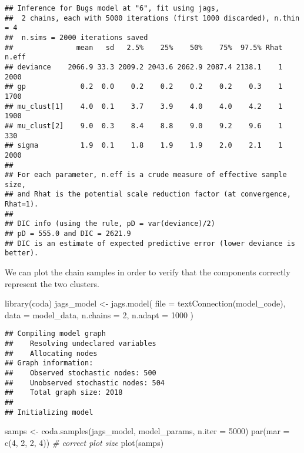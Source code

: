 \documentclass[
  oneside]{book}
\newenvironment{Shaded}{\begin{snugshade}}{\end{snugshade}}
\newcommand{\AttributeTok}[1]{\textcolor[rgb]{0.77,0.63,0.00}{#1}}
\newcommand{\CommentTok}[1]{\textcolor[rgb]{0.56,0.35,0.01}{\textit{#1}}}
\newcommand{\DecValTok}[1]{\textcolor[rgb]{0.00,0.00,0.81}{#1}}
\newcommand{\FunctionTok}[1]{\textcolor[rgb]{0.00,0.00,0.00}{#1}}
\newcommand{\NormalTok}[1]{#1}
\newcommand{\OtherTok}[1]{\textcolor[rgb]{0.56,0.35,0.01}{#1}}
\newcommand{\SpecialCharTok}[1]{\textcolor[rgb]{0.00,0.00,0.00}{#1}}
\begin{document}
\begin{Shaded}
\end{Shaded}

\begin{verbatim}
## Inference for Bugs model at "6", fit using jags,
##  2 chains, each with 5000 iterations (first 1000 discarded), n.thin = 4
##  n.sims = 2000 iterations saved
##               mean   sd   2.5%    25%    50%    75%  97.5% Rhat n.eff
## deviance    2066.9 33.3 2009.2 2043.6 2062.9 2087.4 2138.1    1  2000
## gp             0.2  0.0    0.2    0.2    0.2    0.2    0.3    1  1700
## mu_clust[1]    4.0  0.1    3.7    3.9    4.0    4.0    4.2    1  1900
## mu_clust[2]    9.0  0.3    8.4    8.8    9.0    9.2    9.6    1   330
## sigma          1.9  0.1    1.8    1.9    1.9    2.0    2.1    1  2000
## 
## For each parameter, n.eff is a crude measure of effective sample size,
## and Rhat is the potential scale reduction factor (at convergence, Rhat=1).
## 
## DIC info (using the rule, pD = var(deviance)/2)
## pD = 555.0 and DIC = 2621.9
## DIC is an estimate of expected predictive error (lower deviance is better).
\end{verbatim}

We can plot the chain samples in order to verify that the
components correctly represent the two clusters.

\begin{Shaded}
\begin{Highlighting}[]
\FunctionTok{library}\NormalTok{(coda)}
\NormalTok{jags\_model }\OtherTok{\textless{}{-}} \FunctionTok{jags.model}\NormalTok{(}
  \AttributeTok{file =} \FunctionTok{textConnection}\NormalTok{(model\_code),}
  \AttributeTok{data =}\NormalTok{ model\_data,}
  \AttributeTok{n.chains =} \DecValTok{2}\NormalTok{,}
  \AttributeTok{n.adapt =} \DecValTok{1000}
\NormalTok{)}
\end{Highlighting}
\end{Shaded}

\begin{verbatim}
## Compiling model graph
##    Resolving undeclared variables
##    Allocating nodes
## Graph information:
##    Observed stochastic nodes: 500
##    Unobserved stochastic nodes: 504
##    Total graph size: 2018
## 
## Initializing model
\end{verbatim}

\begin{Shaded}
\begin{Highlighting}[]
\NormalTok{samps }\OtherTok{\textless{}{-}} \FunctionTok{coda.samples}\NormalTok{(jags\_model, model\_params, }\AttributeTok{n.iter =} \DecValTok{5000}\NormalTok{)}
\FunctionTok{par}\NormalTok{(}\AttributeTok{mar =} \FunctionTok{c}\NormalTok{(}\DecValTok{4}\NormalTok{, }\DecValTok{2}\NormalTok{, }\DecValTok{2}\NormalTok{, }\DecValTok{4}\NormalTok{)) }\CommentTok{\# correct plot size}
\FunctionTok{plot}\NormalTok{(samps)}
\end{Highlighting}
\end{Shaded}
\end{document}

